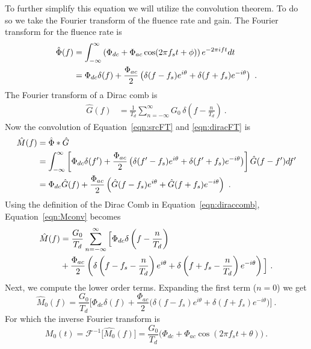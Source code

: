 To further simplify this equation we will utilize the convolution theorem. To do so we take the Fourier transform of the fluence rate and gain. The Fourier transform for the fluence rate is
\begin{align}
\label{eqn:srcFT}
\hat{\Phi}(f) 
&=\int_{-\infty}^{\infty} \left(\Phi_{dc}+\Phi_{ac} \cos(2 \pi f_s t+\phi)\right) e^{- 2 \pi i f t} dt \notag \\
&=\Phi_{dc} \delta(f) + \frac{\Phi_{ac}}{2} \left( \delta(f-f_s)e^{i\theta}+\delta(f+f_s)e^{-i\theta}\right) \ .
\end{align}
The Fourier transform of a Dirac comb is
\begin{align}
\label{eqn:diracFT}
\hat{G}(f)
&=\frac{1}{T_d}\sum_{n=-\infty}^{\infty} G_0\,\delta\left( f - \frac{n}{T_d}\right) \ .
\end{align}
\noindent
Now the convolution of Equation~\ref{eqn:srcFT} and \ref{eqn:diracFT} is
\begin{align}
\label{eqn:Mconv}
\hat{M}(f)
&=\hat{\Phi}*\hat{G} \notag\\
&=\int_{-\infty}^{\infty} \left[\Phi_{dc} \delta(f') + \frac{\Phi_{ac}}{2} \left( \delta(f'-f_s)e^{i\theta} + \delta(f'+f_s)e^{-i\theta}\right)\right] \hat{G}(f-f')df' \notag \\
&=\Phi_{dc} \hat{G}(f)+ \frac{\Phi_{ac}}{2}\left(\hat{G}(f-f_s)e^{i\theta}+\hat{G}(f+f_s)e^{-i\theta}\right) \ .
\end{align}
Using the definition of the Dirac Comb in Equation~\ref{eqn:diraccomb}, Equation~\ref{eqn:Mconv} becomes
\begin{align}
\hat{M}(f) &=\frac{G_0}{T_{d}} \sum_{n=-\infty}^{\infty} \Big[\Phi_{dc}\delta \left( f - \frac{n}{T_{d}}\right) \notag\\
&+ \frac{\Phi_{ac}}{2} \left(\delta \left( f-f_s -\frac{n}{T_{d}}\right)e^{i\theta} + \delta\left(f+f_s-\frac{n}{T_{d}}\right)e^{-i\theta}\right) \Big] \ .
\end{align}
Next, we compute the lower order terms. Expanding the first term ($n=0$) we get
\pagebreak
\begin{equation}
\hat{M}_0(f)=\frac{G_0}{T_{d}}\Big[\Phi_{dc}\delta(f)+\frac{\Phi_{ac}}{2}\Big( \delta(f-f_s)e^{i\theta}+\delta(f+f_s)e^{-i\theta}\Big)\Big] \ .
\end{equation}
\noindent
For which the inverse Fourier transform is
\begin{equation}
M_0(t)=\mathcal{F}^{-1}\Big[\hat{M_0}(f)\Big] =\frac{G_0}{T_{d}}\Big(\Phi_{dc}+\Phi_{ac}\cos(2\pi f_st+\theta)\Big) \ .
\end{equation}

